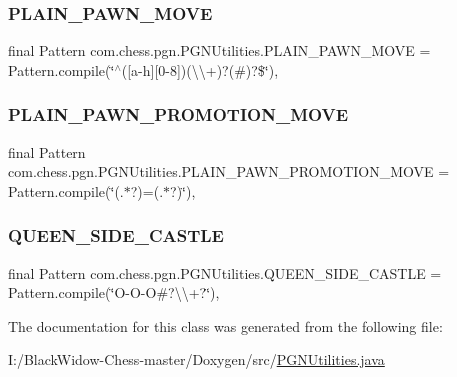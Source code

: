 \subsubsection{\texorpdfstring{PLAIN\_PAWN\_MOVE}{PLAIN\_PAWN\_MOVE}}
{\footnotesize\ttfamily final Pattern com.\+chess.\+pgn.\+P\+G\+N\+Utilities.\+P\+L\+A\+I\+N\+\_\+\+P\+A\+W\+N\+\_\+\+M\+O\+VE = Pattern.\+compile(\char`\"{}$^\wedge$(\mbox{[}a-\/h\mbox{]}\mbox{[}0-\/8\mbox{]})(\textbackslash{}\textbackslash{}+)?(\#)?\$\char`\"{})\hspace{0.3cm}{\ttfamily [static]}, {\ttfamily [private]}}

\mbox{\label{classcom_1_1chess_1_1pgn_1_1_p_g_n_utilities_a56ec3a93f077efe83456b24779573fc7}} 
\subsubsection{\texorpdfstring{PLAIN\_PAWN\_PROMOTION\_MOVE}{PLAIN\_PAWN\_PROMOTION\_MOVE}}
{\footnotesize\ttfamily final Pattern com.\+chess.\+pgn.\+P\+G\+N\+Utilities.\+P\+L\+A\+I\+N\+\_\+\+P\+A\+W\+N\+\_\+\+P\+R\+O\+M\+O\+T\+I\+O\+N\+\_\+\+M\+O\+VE = Pattern.\+compile(\char`\"{}(.$\ast$?)=(.$\ast$?)\char`\"{})\hspace{0.3cm}{\ttfamily [static]}, {\ttfamily [private]}}

\mbox{\label{classcom_1_1chess_1_1pgn_1_1_p_g_n_utilities_a917072145ceea754cb8cd86d1683e19d}} 
\subsubsection{\texorpdfstring{QUEEN\_SIDE\_CASTLE}{QUEEN\_SIDE\_CASTLE}}
{\footnotesize\ttfamily final Pattern com.\+chess.\+pgn.\+P\+G\+N\+Utilities.\+Q\+U\+E\+E\+N\+\_\+\+S\+I\+D\+E\+\_\+\+C\+A\+S\+T\+LE = Pattern.\+compile(\char`\"{}O-\/O-\/O\#?\textbackslash{}\textbackslash{}+?\char`\"{})\hspace{0.3cm}{\ttfamily [static]}, {\ttfamily [private]}}



The documentation for this class was generated from the following file\+:\begin{DoxyCompactItemize}
\item 
I\+:/\+Black\+Widow-\/\+Chess-\/master/\+Doxygen/src/\mbox{\hyperlink{_p_g_n_utilities_8java}{P\+G\+N\+Utilities.\+java}}\end{DoxyCompactItemize}
